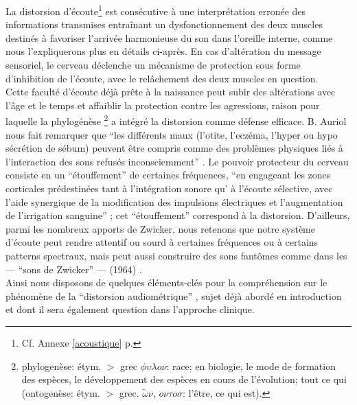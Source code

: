  La distorsion d'écoute\footnote {Cf. Annexe \ref{acoustique} p. \pageref{acoustique}} %
 est consécutive à une interprétation
erronée des informations transmises entraînant un dysfonctionnement
des deux muscles destinés à favoriser l'arrivée
harmonieuse du son dans l'oreille interne, comme nous l'expliquerons plus en détails ci-après.
En cas d'altération du message sensoriel,
le cerveau déclenche un mécanisme de protection sous forme
d'inhibition de l'écoute, avec le relâchement des deux muscles en
question. 
 \\
Cette faculté d'écoute déjà prête à la naissance peut subir des
altérations avec l'âge et
le temps et affaiblir la protection contre les agressions, raison pour
laquelle la phylogénèse \footnote{ phylogenèse: étym. $>$ grec $\phi
  \upsilon \lambda o \nu $: race; en biologie, le mode de formation des espèces, le développement
  des espèces en cours de l'évolution; tout ce qui (ontogenèse:
  étym. $>$ grec. $\tilde{\omega}\nu$, $o \nu \tau o
  \sigma$: l'être,
ce qui est).}  a intégré la distorsion comme défense
efficace.
B. Auriol nous fait
remarquer que
\enquote {les différents maux (l'otite, l'eczéma, l'hyper
ou hypo sécrétion de sébum) peuvent être compris comme des problèmes physiques liés à l'interaction des sons refusés
inconsciemment} \autocite [19--20]  {auriol:cle}.
Le pouvoir protecteur du cerveau consiste en un  ``étouffement'' de
certaines fréquences, \enquote {en engageant les zones corticales prédestinées
tant à
l'intégration sonore qu' à l'écoute sélective,  avec l'aide synergique de la
modification des impulsions électriques et l'augmentation de
l'irrigation sanguine} \autocite [14] {auriol:cle};
cet ``étouffement'' correspond à la distorsion.
D'ailleurs,  parmi les nombreux apports de Zwicker, nous retenons que 
notre 
système d'écoute peut rendre
attentif ou sourd à certaines fréquences ou à certains patterns
spectraux, mais peut aussi construire des sons fantômes comme dans les --- ``sons de 
Zwicker'' --- (1964) \autocite[p 84] {auriol:cle}.
\\
Ainsi nous disposons de quelques éléments-clés pour la compréhension
sur le phénomène de la ``distorsion audiométrique'' \autocite
{auriol:cle}, sujet déjà abordé en introduction et dont il sera également question dans l'approche
clinique.
\\
